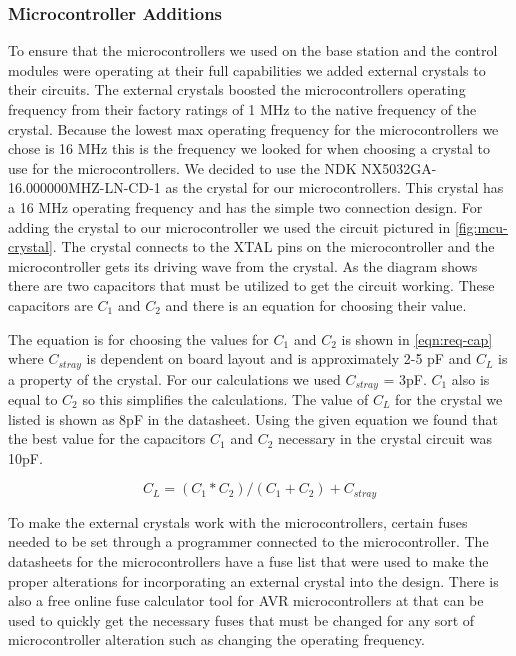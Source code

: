 \subsubsection{Microcontroller Additions}
To ensure that the microcontrollers we used on the base station and the control
modules were operating at their full capabilities we added external
crystals to their circuits. The external crystals boosted the
microcontrollers operating frequency from their factory ratings of 1 MHz to the
native frequency of the crystal.  Because the lowest max operating frequency
for the microcontrollers we chose is 16 MHz this is the frequency we looked for
when choosing a crystal to use for the microcontrollers. We decided to use
the NDK NX5032GA{}-16.000000MHZ{}-LN{}-CD{}-1 as the crystal for our
microcontrollers. This crystal has a 16 MHz operating frequency and has
the simple two connection design. For adding the crystal to our microcontroller
we used the circuit pictured in \autoref{fig:mcu-crystal}. The crystal
connects to the XTAL pins on the microcontroller and the microcontroller gets
its driving wave from the crystal. As the diagram shows there are two
capacitors that must be utilized to get the circuit working. These capacitors
are $C_{1}$ and $C_{2}$ and there is an equation for
choosing their value.


The equation is for choosing the values for $C_{1}$ and
$C_{2}$ is shown in \autoref{eqn:req-cap} where
$C_{stray}$ is dependent on board layout and is approximately 2-5 pF
and $C_{L}$ is a property of the crystal. For our calculations we
used $C_{stray}$ = 3pF. $C_{1}$ also is equal to
$C_{2}$ so this simplifies the calculations. The value of
$C_{L}$ for the crystal we listed is shown as 8pF in the datasheet.
Using the given equation we found that the best value for the capacitors
$C_{1}$ and $C_{2}$ necessary in the crystal circuit was
10pF.

\begin{equation}
  C_{L} = (C_1 * C_2) / (C_1+C_2) + C_{stray}
\label{eqn:req-cap}
\end{equation}

To make the external crystals work with the microcontrollers, certain fuses
needed to be set through a programmer connected to the microcontroller. The
datasheets for the microcontrollers have a fuse list that were used to make
the proper alterations for incorporating an external crystal into the design.
There is also a free online fuse calculator tool for AVR microcontrollers at
\cite{link2} that can be used to quickly get the
necessary fuses that must be changed for any sort of microcontroller alteration
such as changing the operating frequency.

